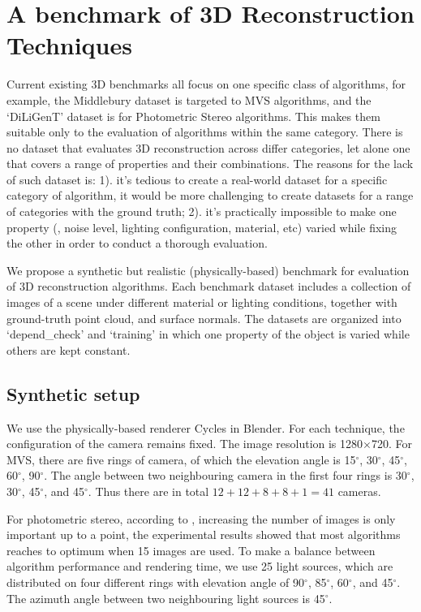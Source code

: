 
\chapter{A benchmark of 3D Reconstruction Techniques}
\label{ch:3DRecon_Benchmark}
Current existing 3D benchmarks all focus on one specific class of algorithms, for example, the Middlebury dataset is targeted to MVS algorithms, and the `DiLiGenT' dataset is for Photometric Stereo algorithms. This makes them suitable only to the evaluation of algorithms within the same category. There is no dataset that evaluates 3D reconstruction across differ categories, let alone one that covers a range of properties and their combinations. The reasons for the lack of such dataset is: 1). it's tedious to create a real-world dataset for a specific category of algorithm, it would be more challenging to create datasets for a range of categories with the ground truth; 2). it's practically impossible to make one property (\eg, noise level, lighting configuration, material, etc) varied while fixing the other in order to conduct a thorough evaluation.

We propose a synthetic but realistic (physically-based) benchmark for evaluation of 3D reconstruction algorithms. Each benchmark dataset includes a collection of images of a scene under different material or lighting conditions, together with ground-truth point cloud, and surface normals. The datasets are organized into `depend\_check' and `training' in which one property of the object is varied while others are kept constant.

\section{Synthetic setup}
We use the physically-based renderer Cycles in Blender. For each technique, the configuration of the camera remains fixed. The image resolution is 1280$\times$720. For MVS, there are five rings of camera, of which the elevation angle is 15$^\circ$, 30$^\circ$, 45$^\circ$, 60$^\circ$, 90$^\circ$. The angle between two neighbouring camera in the first four rings is 30$^\circ$, 30$^\circ$, 45$^\circ$, and 45$^\circ$. Thus there are in total $12+12+8+8+1=41$ cameras.

For photometric stereo, according to \cite{Berkiten2016rgbn}, increasing the number of images is only important up to a point, the experimental results showed that most algorithms reaches to optimum when 15 images are used. To make a balance between algorithm performance and rendering time, we use 25 light sources, which are distributed on four different rings with elevation angle of 90$^\circ$, 85$^\circ$, 60$^\circ$, and 45$^\circ$. The azimuth angle between two neighbouring light sources is 45$^\circ$.

